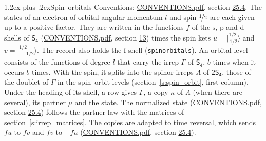 \documentclass[10pt,a4paper]{article}
\makeatletter
\renewcommand\section{\@startsection{section}{1}{\z@}{-3ex plus -1ex minus -.2ex}%
  {1.2ex plus .2ex}{\normalfont\large\sffamily\bfseries\color{parttitle}}}
\numberwithin{equation}{section}
\newcommand{\grp}[1]{\mathsf{#1}}
\newcommand{\orbital}[1]{\mathrm{#1}}
\newcommand{\mult}{\kappa}
\newcommand{\intx}{\mu}
\newcommand{\jm}[2]{\bigl\lvert{}^{#1}_{\,#2}\bigr\rangle}
\makeatother
\begin{document}
\section{Spin--orbitals}\label{s:spin_orbitals}
Conventions: \href{../../CONVENTIONS.pdf}{CONVENTIONS.pdf}, section \href{../../CONVENTIONS.pdf\#conv.25.4}{25.4}.
\leavevmode\label{n:index.orbital.l}The states of an electron of orbital angular momentum $l$ and spin $\nicefrac{1}{2}$ are each given up to a positive factor. \label{n:local.spinor.uv}\label{n:local.function.f}They are written in the functions $f$ of the $\orbital{s}$, $\orbital{p}$ and $\orbital{d}$ shells of \href{../../../rotation/data/pdf/S4.pdf}{$\grp{S_{4}}$} (\href{../../CONVENTIONS.pdf}{CONVENTIONS.pdf}, section \href{../../../rotation/CONVENTIONS.pdf\#conv.13}{13}) times the spin kets $u = \jm{1/2}{1/2}$ and $v = \jm{1/2}{-1/2}$. The record also holds the $\orbital{f}$ shell (\texttt{spinorbitals}). An orbital level consists of the functions of degree $l$ that carry the irrep $\Gamma$ of \href{../../../rotation/data/pdf/S4.pdf}{$\grp{S_{4}}$}, $b$ times when it occurs $b$ times. With the spin, it splits into the spinor irreps $\Lambda$ of $\grp{2S_{4}}$, those of the doublet of $\Gamma$ in the spin--orbit levels (section~\ref{s:spin_orbit}, first column). \label{n:head.state}Under the heading of its shell, a row gives $\Gamma$, a copy $\mult$ of $\Lambda$ (when there are several), its partner $\intx$ and the state. The normalized state (\href{../../CONVENTIONS.pdf}{CONVENTIONS.pdf}, section \href{../../CONVENTIONS.pdf\#conv.25.4}{25.4}) follows the partner law with the matrices of section~\ref{s:irrep_matrices}. The copies are adapted to time reversal, which sends $f u$ to $f v$ and $f v$ to $-f u$ (\href{../../CONVENTIONS.pdf}{CONVENTIONS.pdf}, section \href{../../CONVENTIONS.pdf\#conv.25.4}{25.4}).
\end{document}
